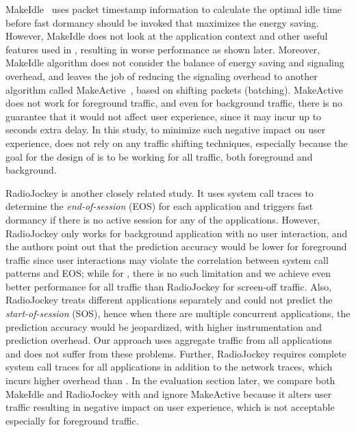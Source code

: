 MakeIdle~\cite{makeidle} uses packet timestamp information to calculate the optimal idle time before fast dormancy should be invoked that maximizes the energy saving. However, MakeIdle does not look at the application context and other useful features used in \NAME, resulting in worse performance as shown later. Moreover, MakeIdle algorithm does not consider the balance of energy saving and signaling overhead, and leaves the job of reducing the signaling overhead to another algorithm called MakeActive~\cite{makeidle}, based on shifting packets (batching). MakeActive does not work for foreground traffic, and even for background traffic, there is no guarantee that it would not affect user experience, since it may incur up to seconds extra delay. In this study, to minimize such negative impact on user experience, \NAME does not rely on any traffic shifting techniques, especially because the goal for the design of \NAME is to be working for all traffic, both foreground and background.

RadioJockey\cite{radiojockey} is another closely related study. It uses system call traces to determine the {\em end-of-session} (EOS) for each application and triggers fast dormancy if there is no active session for any of the applications. However, RadioJockey only works for background application with no user interaction, and the authors point out that the prediction accuracy would be lower for foreground traffic since user interactions may violate the correlation between system call patterns and EOS; while for \NAME, there is no such limitation and we achieve even better performance for all traffic than RadioJockey for screen-off traffic. Also, RadioJockey treats different applications separately and could not predict the {\em start-of-session} (SOS), hence when there are multiple concurrent applications, the prediction accuracy would be jeopardized, with higher instrumentation and prediction overhead. Our approach uses aggregate traffic from all applications and does not suffer from these problems. Further, RadioJockey requires complete system call traces for all applications in addition to the network traces, which incurs higher overhead than \NAME. In the evaluation section later, we compare both MakeIdle and RadioJockey with \NAME and ignore MakeActive because it alters user traffic resulting in negative impact on user experience, which is not acceptable especially for foreground traffic.


